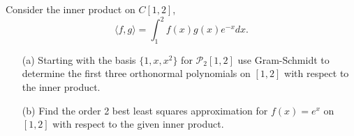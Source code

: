 \documentclass[8pt]{article}
\theoremstyle{definition}
\newenvironment{exercise}[1]
  {\renewcommand\theinnerexercise{#1}\innerexercise}
  {\endinnerexercise}
\begin{document}
\newpage

\begin{exercise}{2}
Consider the inner product on $C[1, 2]$, $$\langle f, g \rangle = \int_{1}^{2} f(x) g(x) e^{-x} dx.$$
\begin{enumerate}
	\item[(a)] Starting with the basis $\{1, x, x^2 \}$ for $\mathcal{P}_2 [1, 2]$ use Gram-Schmidt to determine the first three orthonormal polynomials on $[1, 2]$ with respect to the inner product.
	\item[(b)] Find the order 2 best least squares approximation for $f(x) = e^{x}$ on $[1, 2]$ with respect to the given inner product.
\end{enumerate}
\end{exercise}
\end{document}
